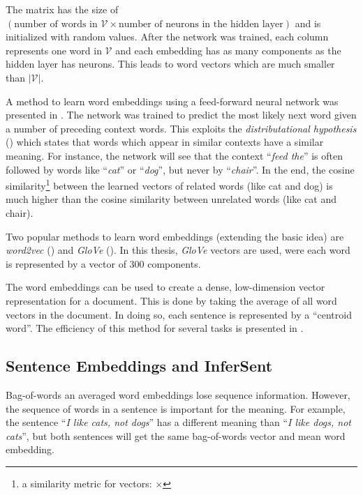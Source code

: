 The matrix has the size of \mbox{$(\text{number of words in } \mathcal{V} \times\allowbreak \text{number of neurons }\allowbreak \text{in the hidden layer})$} and is initialized with random values. After the network was trained, each column represents one word in $\mathcal{V}$ and each embedding has as many components as the hidden layer has neurons. This leads to word vectors which are much smaller than $|\mathcal{V}|$.

A method to learn word embeddings using a feed-forward neural network was presented in \cite{bengio2003neural}. The network was trained to predict the most likely next word given a number of preceding context words. This exploits the \emph{distributational hypothesis} (\cite{harris1954distributional}) which states that words which appear in similar contexts have a similar meaning. For instance, the network will see that the context \enquote{\emph{feed the}} is often followed by words like \enquote{\emph{cat}} or \enquote{\emph{dog}}, but never by \enquote{\emph{chair}}. In the end, the cosine similarity\footnote{a similarity metric for vectors: $\times$} between the learned vectors of related words (like cat and dog) is much higher than the cosine similarity between unrelated words (like cat and chair).

Two popular methods to learn word embeddings (extending the basic idea) are \emph{word2vec} (\cite{NIPS2013_5021}) and \emph{GloVe} (\cite{pennington2014glove}). In this thesis, \emph{GloVe} vectors are used, were each word is represented by a vector of 300 components.

The word embeddings can be used to create a dense, low-dimension vector representation for a document. This is done by taking the average of all word vectors in the document. In doing so, each sentence is represented by a \enquote{centroid word}. The efficiency of this method for several tasks is presented in \cite{Wieting:2015aa}.

\subsection{Sentence Embeddings and InferSent}
Bag-of-words an averaged word embeddings lose sequence information. However, the sequence of words in a sentence is important for the meaning. For example, the sentence \enquote{\emph{I like cats, not dogs}} has a different meaning than \enquote{\emph{I like dogs, not cats}}, but both sentences will get the same bag-of-words vector and mean  word embedding.

